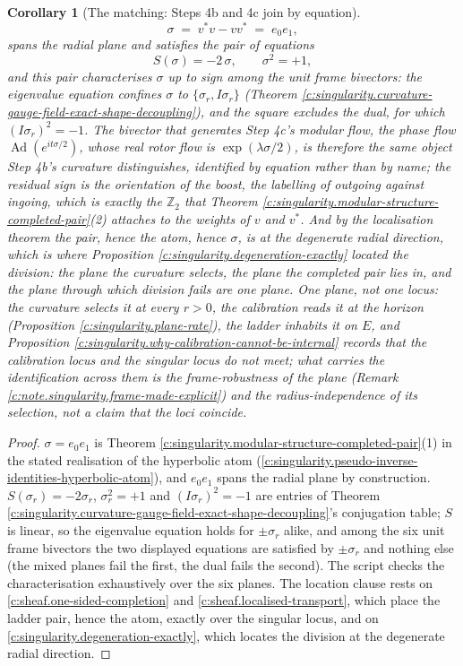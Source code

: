 \documentclass[11pt]{article}
\newtheorem{corollary}[theorem]{Corollary}
\theoremstyle{definition}
\theoremstyle{plain}
\begin{document}
\begin{corollary}[The matching: Steps 4b and 4c join by equation]
\[
\sigma \;=\; v^*v - vv^* \;=\; e_0 e_1 ,
\]
spans the radial plane and satisfies the pair of equations
\[
S(\sigma) = -2\,\sigma, \qquad \sigma^2 = +1 ,
\]
and this pair characterises $\sigma$ up to sign among the unit frame bivectors: the eigenvalue equation confines $\sigma$ to $\{\sigma_r, I\sigma_r\}$ (Theorem \ref{c:singularity.curvature-gauge-field-exact-shape-decoupling}), and the square excludes the dual, for which $(I\sigma_r)^2 = -1$. The bivector that generates Step 4c's modular flow, the phase flow $\operatorname{Ad}(e^{it\sigma/2})$, whose real rotor flow is $\exp(\lambda\sigma/2)$, is therefore the same object Step 4b's curvature distinguishes, identified by equation rather than by name; the residual sign is the orientation of the boost, the labelling of outgoing against ingoing, which is exactly the $\mathbb{Z}_2$ that Theorem \ref{c:singularity.modular-structure-completed-pair}(2) attaches to the weights of $v$ and $v^*$. And by the localisation theorem \cite[Thm.~4.4, Cor.~4.5]{ButlerT4} the pair, hence the atom, hence $\sigma$, is at the degenerate radial direction, which is where Proposition \ref{c:singularity.degeneration-exactly} located the division: the plane the curvature selects, the plane the completed pair lies in, and the plane through which division fails are one plane. One plane, not one locus: the curvature selects it at every $r > 0$, the calibration reads it at the horizon (Proposition \ref{c:singularity.plane-rate}), the ladder inhabits it on $E$, and Proposition \ref{c:singularity.why-calibration-cannot-be-internal} records that the calibration locus and the singular locus do not meet; what carries the identification across them is the frame-robustness of the plane (Remark \ref{c:note.singularity.frame-made-explicit}) and the radius-independence of its selection, not a claim that the loci coincide.
\end{corollary}
\begin{proof}
$\sigma = e_0 e_1$ is Theorem \ref{c:singularity.modular-structure-completed-pair}(1) in the stated realisation of the hyperbolic atom (\ref{c:singularity.pseudo-inverse-identities-hyperbolic-atom}), and $e_0 e_1$ spans the radial plane by construction. $S(\sigma_r) = -2\sigma_r$, $\sigma_r^2 = +1$ and $(I\sigma_r)^2 = -1$ are entries of Theorem \ref{c:singularity.curvature-gauge-field-exact-shape-decoupling}'s conjugation table; $S$ is linear, so the eigenvalue equation holds for $\pm\sigma_r$ alike, and among the six unit frame bivectors the two displayed equations are satisfied by $\pm\sigma_r$ and nothing else (the mixed planes fail the first, the dual fails the second). The script checks the characterisation exhaustively over the six planes. The location clause rests on \ref{c:sheaf.one-sided-completion} and \ref{c:sheaf.localised-transport}, which place the ladder pair, hence the atom, exactly over the singular locus, and on \ref{c:singularity.degeneration-exactly}, which locates the division at the degenerate radial direction.

\end{proof}
\end{document}

